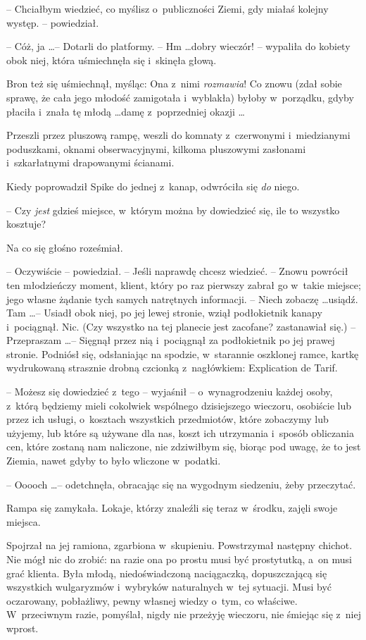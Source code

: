 \documentclass[oneside,polish,11pt,rmheadings]{mwbk}
\begin{document}
-- Chciałbym wiedzieć, co myślisz o~publiczności Ziemi, gdy miałaś kolejny występ. -- powiedział. 

-- Cóż, ja \ldots  -- Dotarli do platformy. -- Hm \ldots  dobry wieczór! -- wypaliła do kobiety obok niej, która uśmiechnęła się i~skinęła głową. 

Bron też się uśmiechnął, myśląc: Ona z~nimi \textit{rozmawia}! Co znowu (zdał sobie sprawę, że cała jego młodość zamigotała i~wyblakła) byłoby w~porządku, gdyby płaciła i~znała tę młodą \ldots  damę z~poprzedniej okazji \ldots  

Przeszli przez pluszową rampę, weszli do komnaty z~czerwonymi i~miedzianymi poduszkami, oknami obserwacyjnymi, kilkoma pluszowymi zasłonami i~szkarłatnymi drapowanymi ścianami. 

Kiedy poprowadził Spike do jednej z~kanap, odwróciła się \textit{do }niego. 

-- Czy \textit{jest }gdzieś miejsce, w~którym można by dowiedzieć się, ile to wszystko kosztuje? 

Na co się głośno roześmiał.  

-- Oczywiście -- powiedział. -- Jeśli naprawdę chcesz wiedzieć. -- Znowu powrócił ten młodzieńczy moment, klient, który po raz pierwszy zabrał go w~takie miejsce; jego własne żądanie tych samych natrętnych informacji. -- Niech zobaczę \ldots  usiądź.  Tam \ldots  -- Usiadł obok niej, po jej lewej stronie, wziął podłokietnik kanapy i~pociągnął. Nic. (Czy wszystko na tej planecie jest zacofane? zastanawiał się.) -- Przepraszam \ldots -- Sięgnął przez nią i~pociągnął za podłokietnik po jej prawej stronie. Podniósł się, odsłaniając na spodzie, w~starannie oszklonej ramce, kartkę wydrukowaną strasznie drobną czcionką z~nagłówkiem: Explication de Tarif. 

-- Możesz się dowiedzieć z~tego -- wyjaśnił -- o~wynagrodzeniu każdej osoby, z~którą będziemy mieli cokolwiek wspólnego dzisiejszego wieczoru, osobiście lub przez ich usługi, o~kosztach wszystkich przedmiotów, które zobaczymy lub użyjemy, lub które są używane dla nas, koszt ich utrzymania i~sposób obliczania cen, które zostaną nam naliczone, nie zdziwiłbym się, biorąc pod uwagę, że to jest Ziemia, nawet gdyby to było wliczone w~podatki. 

-- Ooooch \ldots  -- odetchnęła, obracając się na wygodnym siedzeniu, żeby przeczytać. 

Rampa się zamykała. Lokaje, którzy znaleźli się teraz w~środku, zajęli swoje miejsca. 

Spojrzał na jej ramiona, zgarbiona w~skupieniu. Powstrzymał następny chichot. Nie mógł nic do zrobić: na razie ona po prostu musi być prostytutką, a~on musi grać klienta. Była młodą, niedoświadczoną naciągaczką, dopuszczającą się wszystkich wulgaryzmów i~wybryków naturalnych w~tej sytuacji. Musi być oczarowany, pobłażliwy, pewny własnej wiedzy o~tym, co właściwe. W~przeciwnym razie, pomyślał, nigdy nie przeżyję wieczoru, nie śmiejąc się z~niej wprost. 
\end{document}
